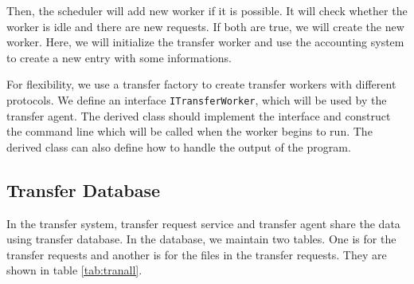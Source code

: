 Then, the scheduler will add new worker if it is possible.
It will check whether the worker is idle and there are new requests.
If both are true, we will create the new worker.
Here, we will initialize the transfer worker and use the accounting
system to create a new entry with some informations.

For flexibility, we use a transfer factory to create transfer workers
with different protocols. 
We define an interface {\tt ITransferWorker},
which will be used by the transfer agent. The derived class should
implement the interface and construct the command line which will 
be called when the worker begins to run.
The derived class can also define how to handle the output of the 
program.

\subsection{Transfer Database}

In the transfer system, transfer request service and transfer agent
share the data using transfer database. In the database, we maintain
two tables. One is for the transfer requests and another is for the 
files in the transfer requests. They are shown in table 
\ref{tab:tranall}.


